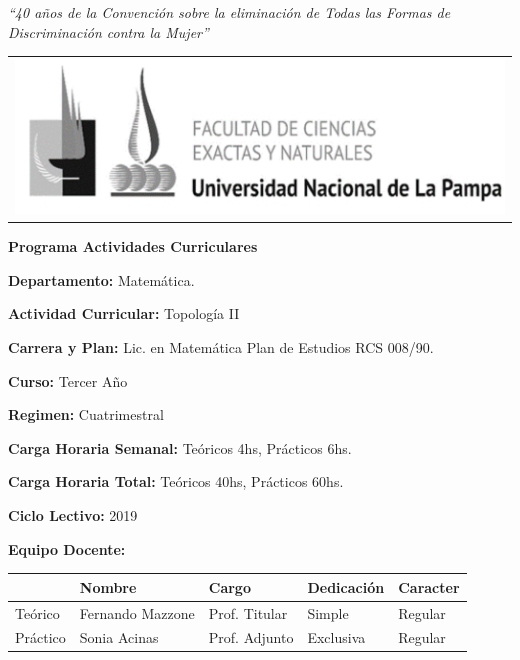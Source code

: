 \documentclass[12pt]{article}
\begin{document}
\pagestyle{plain}


\setlength{\unitlength}{1cm}
%
%

\begin{flushright}
{\setmainfont{STIX}\small\textit{
``40 años de la Convención sobre la eliminación de Todas las Formas de Discriminación contra la Mujer''}
}
\end{flushright}


\noindent\begin{tabular}{m{} }
\includegraphics[scale=.25]{EscudoUNLPam.png} 

\\
\end{tabular}

\setlength{\parindent}{0pt} %

\begin{center}
 \textbf{\Large Programa Actividades Curriculares}
\end{center}





 \textbf{Departamento:}  Matemática.

 \textbf{Actividad Curricular:} Topología II

 \textbf{Carrera y Plan:}  Lic. en Matemática Plan de Estudios RCS 008/90.

\textbf{Curso:} Tercer Año

\textbf{Regimen:} Cuatrimestral

\textbf{Carga Horaria Semanal:} Teóricos 4hs, Prácticos 6hs. 

\textbf{Carga Horaria Total:} Teóricos 40hs, Prácticos 60hs.

\textbf{Ciclo Lectivo:} 2019



\textbf{Equipo Docente:}  

\begin{table}[h]
\begin{tabular}{|l|l|l|l|l|}\hline
& Nombre & Cargo  & Dedicación & Caracter\\ \hline
Teórico & Fernando Mazzone & Prof. Titular & Simple & Regular\\\hline
Práctico & Sonia Acinas & Prof. Adjunto & Exclusiva & Regular\\\hline 
\end{tabular} 
\end{table}
\end{document}
